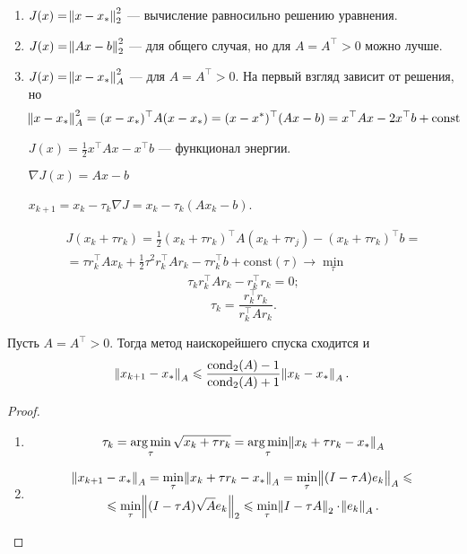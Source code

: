 \begin{enumerate}
    \item $J(x) = \norm{x - x_*}_2^2$ --- вычисление равносильно решению
        уравнения.
    \item $J(x) = \norm{A x - b}_2^2$ --- для общего случая, но для
        $A = A^\top > 0$ можно лучше.
    \item $J(x) = \norm{x - x_*}_A^2$ --- для $A = A^\top > 0$. На первый взгляд
        зависит от решения, но
        \[
            \norm{x - x_*}_A^2 = (x - x_*)^\top A (x - x_*) =
            (x - x^*)^\top (A x - b) = x^\top A x - 2 x^\top b + \textrm{const}
        \]

        $J(x) = \frac{1}{2} x^\top A x - x^\top b$ --- функционал энергии.

        $\nabla J(x) = A x - b$

        $x_{k+1} = x_k - \tau_k \nabla J = x_k - \tau_k (A x_k - b)$.

        \begin{multline*}
            J(x_k + \tau r_k) = \frac{1}{2} (x_k + \tau r_k)^\top A
            (x_k + \tau r_j) - (x_k + \tau r_k)^\top b =\\=
            \tau r_k^\top A x_k + \frac{1}{2} \tau^2 r_k^\top A r_k
            - \tau r_k^\top b + \textrm{const}(\tau) \to \min_\tau
        \end{multline*}
        \[
            \tau_k r_k^\top A r_k - r_k^\top r_k = 0;
        \]
        \[
            \tau_k = \frac{r_k^\top r_k}{r_k^\top A r_k}.
        \]
\end{enumerate}

\begin{theorem}
    Пусть $A = A^\top > 0$. Тогда метод наискорейшего спуска сходится и
    \[
        \norm{x_{k + 1} - x_*}_A \leqslant \frac{\operatorname{cond}_2(A) - 1}{\operatorname{cond}_2(A) + 1}
        \norm{x_k - x_*}_A.
    \]
\end{theorem}

\begin{proof}
    \begin{enumerate}
        \item
            \[
                \tau_k = \operatorname*{\arg \min}_\tau \sqrt{x_k + \tau r_k}
                = \operatorname*{\arg \min}_\tau \norm{x_k + \tau r_k - x_*}_A
            \]
        \item
            \begin{multline*}
                \norm{x_{k + 1} - x_*}_A
                = \min_\tau \norm{x_k + \tau r_k - x_*}_A
                = \min_\tau \norm{(I - \tau A) e_k}_A
                \leqslant\\\leqslant \min_\tau \norm{(I - \tau A) \sqrt{A} e_k}_2
                \leqslant \min_\tau \norm{I - \tau A}_2 \cdot \norm{e_k}_A.
            \end{multline*}
    \end{enumerate}
\end{proof}

